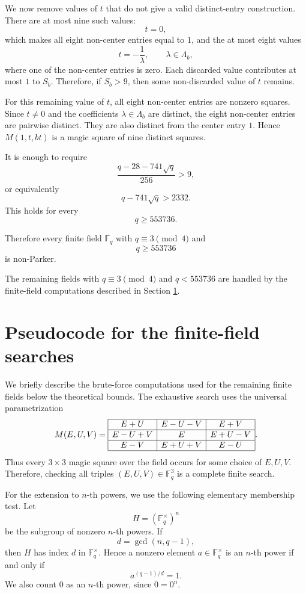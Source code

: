 \documentclass{article}
\newcommand{\F}{\mathbb F}
\theoremstyle{definition}
\numberwithin{equation}{section}
\begin{document}
We now remove values of \(t\) that do not give a valid distinct-entry
construction.  There are at most nine such values:
\[
t=0,
\]
which makes all eight non-center entries equal to \(1\), and the at most eight
values
\[
t=-\frac1\lambda,
\qquad \lambda\in\Lambda_b,
\]
where one of the non-center entries is zero.  Each discarded value contributes at
most \(1\) to \(S_b\).  Therefore, if \(S_b>9\), then some non-discarded value of
\(t\) remains.

For this remaining value of \(t\), all eight non-center entries are nonzero
squares.  Since \(t\neq0\) and the coefficients \(\lambda\in\Lambda_b\) are
distinct, the eight non-center entries are pairwise distinct.  They are also
distinct from the center entry \(1\).  Hence \(M(1,t,bt)\) is a magic square of
nine distinct squares.

It is enough to require
\[
\frac{q-28-741\sqrt q}{256}>9,
\]
or equivalently
\[
q-741\sqrt q>2332.
\]
This holds for every
\[
q\geq553736.
\]

Therefore every finite field \(\F_q\) with \(q\equiv3\pmod4\) and
\[
q\geq553736
\]
is non-Parker.

The remaining fields with \(q\equiv3\pmod4\) and \(q<553736\) are handled by the
finite-field computations described in Section \ref{sec:finite-field-searches}.

\section{Pseudocode for the finite-field searches}
\label{sec:finite-field-searches}

We briefly describe the brute-force computations used for the remaining finite
fields below the theoretical bounds. The exhaustive search uses the universal
parametrization
\[
M(E,U,V)=
\begin{array}{|c|c|c|}
\hline
E+U & E-U-V & E+V\\
\hline
E-U+V & E & E+U-V\\
\hline
E-V & E+U+V & E-U\\
\hline
\end{array}.
\]
Thus every \(3\times 3\) magic square over the field occurs for some choice of
\(E,U,V\). Therefore, checking all triples \((E,U,V)\in\F_q^3\) is a
complete finite search.

For the extension to \(n\)-th powers, we use the following elementary membership
test. Let
\[
H=(\F_q^\times)^n
\]
be the subgroup of nonzero \(n\)-th powers. If
\[
d=\gcd(n,q-1),
\]
then \(H\) has index \(d\) in \(\F_q^\times\). Hence a nonzero element
\(a\in\F_q^\times\) is an \(n\)-th power if and only if
\[
a^{(q-1)/d}=1.
\]
We also count \(0\) as an \(n\)-th power, since \(0=0^n\).
\end{document}
